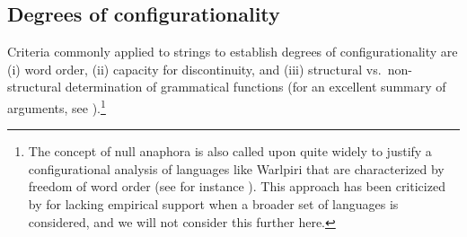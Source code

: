 \documentclass[output=paper,hidelinks]{langscibook}
\begin{document}
\vspace{0.5 cm}

\begin{minipage}[t]{0.5\textwidth}
\end{minipage}%
\begin{minipage}[t]{0.5\textwidth}
\end{minipage}

\vspace{0.5 cm}

\begin{minipage}[t]{0.5\textwidth}
\eabox{\label{Cnonc}
\hspace*{-8mm}
\begin{forest}
[S [\ldots] [X(P)] [X(P)] [X(P)] [\ldots]    ]
\end{forest}
}
\end{minipage}%
\begin{minipage}[t]{0.5\textwidth}
\eabox{\label{Nnonc}
\hspace*{-8mm}
\begin{forest}
[NOM [\ldots] [X(P)] [X(P)] [X(P)] [\ldots]    ]
\end{forest}
}
\end{minipage}

\vspace{0.5 cm}

\subsection{Degrees of configurationality}

Criteria commonly applied to strings to establish degrees of configurationality are (i) word order, (ii) capacity for discontinuity, and (iii) structural vs.\ non-structural determination of grammatical functions (for an excellent summary of arguments, see \cite{nordlinger1998constructive}).\footnote{The concept of null anaphora is also called upon quite widely to justify a configurational analysis of languages like Warlpiri that are characterized by freedom of word order (see for instance \citealt{Jelinek84,Hale93}). This approach has been criticized by \citet{AustBres96} for lacking empirical support when a broader set of languages is considered, and we will not consider this further here.}
\end{document}
